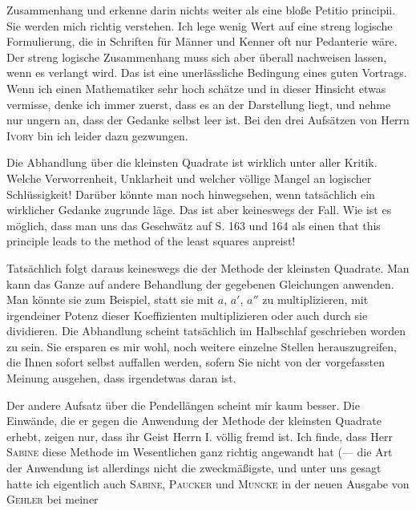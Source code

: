 Zusammenhang und erkenne darin nichts weiter als eine bloße Petitio principii. Sie werden mich richtig verstehen. Ich lege wenig Wert auf eine streng logische Formulierung, die in Schriften für Männer und Kenner oft nur Pedanterie wäre. Der streng logische Zusammenhang muss sich aber überall nachweisen lassen, wenn es verlangt wird. Das ist eine unerlässliche Bedingung eines guten Vortrags. Wenn ich einen Mathematiker sehr hoch schätze und in dieser Hinsicht etwas vermisse, denke ich immer zuerst, dass es  an der Darstellung liegt, und nehme nur ungern an, dass der Gedanke selbst leer ist. Bei den drei Aufsätzen von Herrn \textsc{Ivory} bin ich leider dazu gezwungen.

Die Abhandlung über die kleinsten Quadrate ist wirklich unter aller Kritik. Welche Verworrenheit, Unklarheit und welcher völlige Mangel an logischer Schlüssigkeit! Darüber könnte man noch hinwegsehen, wenn tatsächlich ein wirklicher Gedanke zugrunde läge. Das ist aber keineswegs der Fall. Wie ist es möglich, dass man uns das Geschwätz auf S. 163 und 164 als einen  that this principle leads  to the method of the least squares anpreist!

Tatsächlich folgt daraus keineswegs die  der Methode der kleinsten Quadrate. Man kann das Ganze auf  andere Behandlung der gegebenen Gleichungen anwenden. Man könnte sie zum Beispiel, statt sie mit $a$, $a'$, $a''$ zu multiplizieren, mit irgendeiner Potenz dieser Koeffizienten multiplizieren oder auch durch sie dividieren. Die Abhandlung scheint tatsächlich im Halbschlaf geschrieben worden zu sein. Sie ersparen es mir wohl, noch weitere einzelne Stellen herauszugreifen, die Ihnen sofort selbst auffallen werden, sofern Sie nicht von der vorgefassten Meinung ausgehen, dass irgendetwas daran ist.

Der andere Aufsatz über die Pendellängen scheint mir kaum besser. Die Einwände, die er gegen die Anwendung der Methode der kleinsten Quadrate erhebt, zeigen nur, dass ihr Geist Herrn I. völlig fremd ist. Ich finde, dass Herr \textsc{Sabine} diese Methode im Wesentlichen ganz richtig angewandt hat (— die Art der Anwendung ist allerdings nicht die zweckmäßigste, und unter uns gesagt hatte ich eigentlich auch \textsc{Sabine}, \textsc{Paucker} und \textsc{Muncke} in der neuen Ausgabe von \textsc{Gehler} bei meiner

